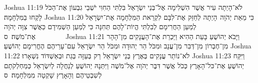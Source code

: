 Joshua 11:19	לֹא־הָיְתָה עִיר אֲשֶׁר הִשְׁלִימָה אֶל־בְּנֵי יִשְׂרָאֵל בִּלְתִּי הַחִוִּי יֹשְׁבֵי גִבְעוֹן אֶת־הַכֹּל לָקְחוּ בַמִּלְחָמָה׃
Joshua 11:20	כִּי מֵאֵת יְהֹוָה  הָיְתָה לְחַזֵּק אֶת־לִבָּם לִקְרַאת הַמִּלְחָמָה אֶת־יִשְׂרָאֵל לְמַעַן הַחֲרִימָם לְבִלְתִּי הֱיוֹת־לָהֶם תְּחִנָּה כִּי לְמַעַן הַשְׁמִידָם כַּאֲשֶׁר צִוָּה יְהֹוָה אֶת־מֹשֶׁה׃ {ס}        
Joshua 11:21	וַיָּבֹא יְהוֹשֻׁעַ בָּעֵת הַהִיא וַיַּכְרֵת אֶת־הָעֲנָקִים מִן־הָהָר מִן־חֶבְרוֹן מִן־דְּבִר מִן־עֲנָב וּמִכֹּל הַר יְהוּדָה וּמִכֹּל הַר יִשְׂרָאֵל עִם־עָרֵיהֶם הֶחֱרִימָם יְהוֹשֻׁעַ׃
Joshua 11:22	לֹא־נוֹתַר עֲנָקִים בְּאֶרֶץ בְּנֵי יִשְׂרָאֵל רַק בְּעַזָּה בְּגַת וּבְאַשְׁדּוֹד נִשְׁאָרוּ׃
Joshua 11:23	וַיִּקַּח יְהוֹשֻׁעַ אֶת־כּל־הָאָרֶץ כְּכֹל אֲשֶׁר דִּבֶּר יְהֹוָה אֶל־מֹשֶׁה וַיִּתְּנָהּ יְהוֹשֻׁעַ לְנַחֲלָה לְיִשְׂרָאֵל כְּמַחְלְקֹתָם לְשִׁבְטֵיהֶם וְהָאָרֶץ שָׁקְטָה מִמִּלְחָמָה׃ {ס}        
